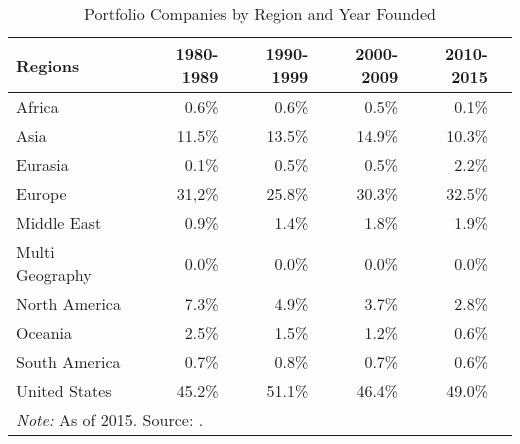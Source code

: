 
\begin{table}[t]
    \caption{\label{tab:pcritablea3} Portfolio Companies by Region and Year Founded}\tabularnewline
    
    \begin{tabular}{@{}lrrrrr@{}}
    \toprule
    Regions & 1980-1989 & 1990-1999 & 2000-2009 & 2010-2015\tabularnewline
    \midrule
    Africa & 0.6\% & 0.6\% & 0.5\% & 0.1\%\tabularnewline
    Asia & 11.5\% & 13.5\% & 14.9\% & 10.3\%\tabularnewline
    Eurasia & 0.1\% & 0.5\% & 0.5\% & 2.2\%\tabularnewline
    Europe & 31,2\% & 25.8\% & 30.3\% & 32.5\%\tabularnewline
    Middle East & 0.9\% & 1.4\% & 1.8\% & 1.9\%\tabularnewline
    Multi Geography & 0.0\% & 0.0\% & 0.0\% & 0.0\%\tabularnewline
    North America & 7.3\% & 4.9\% & 3.7\% & 2.8\%\tabularnewline
    Oceania & 2.5\% & 1.5\% & 1.2\% & 0.6\%\tabularnewline
    South America & 0.7\% & 0.8\% & 0.7\% & 0.6\%\tabularnewline
    United States & 45.2\% & 51.1\% & 46.4\% & 49.0\%\tabularnewline
    \bottomrule
    \multicolumn{6}{l}{\textit{Note: } As of 2015. Source: \citet{jeng2015}.}\tabularnewline
    \end{tabular}
\end{table}